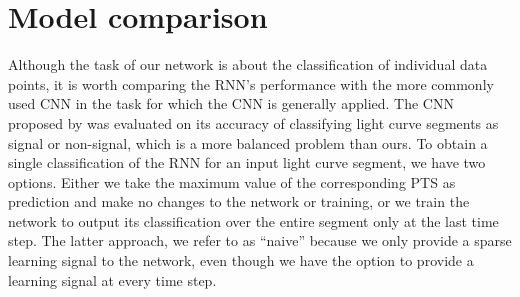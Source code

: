 
\section{Model comparison}
\label{sec:models}

Although the task of our network is about the classification of individual data points, it is worth comparing the RNN's performance with the more commonly used CNN in the task for which the CNN is generally applied. The CNN proposed by \cite{pearson2018searching} was evaluated on its accuracy of classifying light curve segments as signal or non-signal, which is a more balanced problem than ours. To obtain a single classification of the RNN for an input light curve segment, we have two options. Either we take the maximum value of the corresponding PTS as prediction and make no changes to the network or training, or we train the network to output its classification over the entire segment only at the last time step. The latter approach, we refer to as ``naive'' because we only provide a sparse learning signal to the network, even though we have the option to provide a learning signal at every time step. 

